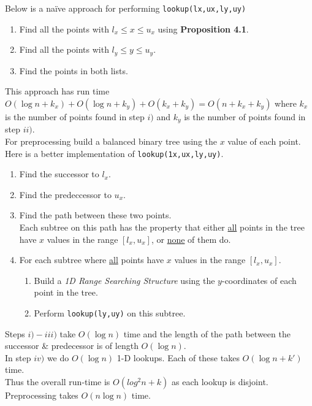 \documentclass[11pt,a4paper]{article}
\begin{document}
Below is a na\"ive approach for performing \lstinline!lookup(lx,ux,ly,uy)!
\begin{enumerate}
	\item Find all the points with $l_x\leq x\leq u_x$ using \textbf{Proposition 4.1}.
	\item Find all the points with $l_y\leq y\leq u_y$.
	\item Find the points in both lists.
\end{enumerate}
This approach has run time $O(\log n+k_x)+O(\log n+k_y)+O(k_x+k_y)=O(n+k_x+k_y)$ where $k_x$ is the number of points found in step $i)$ and $k_y$ is the number of points found in step $ii)$.\\

For preprocessing build a balanced binary tree using the $x$ value of each point.\\
Here is a better implementation of \lstinline!lookup(1x,ux,ly,uy)!.
\begin{enumerate}
	\item Find the successor to $l_x$.
	\item Find the predeccessor to $u_x$.
	\item Find the path between these two points.\\
	Each subtree on this path has the property that either \underline{all} points in the tree have $x$ values in the range $[l_x,u_x]$, or \underline{none} of them do.
	\item For each subtree where \underline{all} points have $x$ values in the range $[l_x,u_x]$.
	\begin{enumerate}
		\item Build a \textit{1D Range Searching Structure} using the $y$-coordinates of each point in the tree.
		\item Perform \lstinline!lookup(ly,uy)! on this subtree.
	\end{enumerate}
\end{enumerate}

Steps $i)-iii)$ take $O(\log n)$ time and the length of the path between the successor \& predecessor is of length $O(\log n)$.\\
In step $iv)$ we do $O(\log n)$ 1-D lookups. Each of these takes $O(\log n+k')$ time.\\
Thus the overall run-time is $O(log^2n+k)$ as each lookup is disjoint.\\
\nb Preprocessing takes $O(n\log n)$ time.
\end{document}
